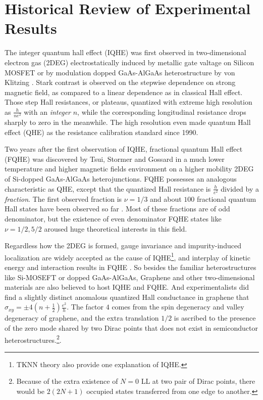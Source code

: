 \documentclass[bachelor,english,numbers]{ustcthesis}
\begin{document}
	\section{Historical Review of Experimental Results}
		\indent\par The integer quantum hall effect (IQHE) was first observed in two-dimensional electron gas (2DEG) electrostatically induced by metallic gate valtage on Silicon MOSFET or by modulation dopped GaAs-AlGaAs heterostructure by von Klitzing \cite{klitzing1980new,von1986quantized,comtet2000aspects}. Stark contrast is observed on the stepwise dependence on strong magnetic field, as compared to a linear dependence as in classical Hall effect. Those step Hall resistances, or plateaus, quantized with extreme high resolution as $\frac{h}{ne^2}$ with an \emph{integer} $n$, while the corresponding longitudinal resistance drops sharply to zero in the meanwhile. The high resolution even made quantum Hall effect (QHE) as the resistance calibration standard since 1990.\par

		Two years after the first observation of IQHE, fractional quantum Hall effect (FQHE) was discovered by Tsui, Stormer and Gossard \cite{tsui1982two,stormer1999fractional} in a much lower temperature and higher magnetic fields environment on a higher mobility 2DEG of Si-dopped GaAs-AlGaAs heterojunctions. FQHE possesses an analogous characteristic as QHE, except that the quantized Hall resistance is $\frac{h}{e^2}$ divided by a \emph{fraction}. The first observed fraction is $\nu=1/3$ and about $100$ fractional quantum Hall states have been observed so far \cite{laughlin1983anomalous}. Most of these fractions are of odd denominator, but the existence of even denominator FQHE states like $\nu=1/2,5/2$ aroused huge theoretical interests in this field.\par
		
		Regardless how the 2DEG is formed, gauge invariance and impurity-induced localization \cite{von1986quantized,tong2016lectures} are widely accepted as the cause of IQHE\footnote{TKNN theory \cite{tong2016lectures} also provide one explanation of IQHE.}, and interplay of kinetic energy and interaction results in FQHE \cite{simon1998chern}. So besides the familiar heterostructures like Si-MOSEFT or dopped GaAs-AlGaAs, Graphene and other two-dimensional materials are also believed to host IQHE and FQHE. And experimentalists did find a slightly distinct anomalous quantized Hall conductance in graphene \cite{zhang2005experimental} that $\sigma_{xy}=\pm4(n+\frac{1}{2})\frac{e^2}{h}$. The factor $4$ comes from the spin degeneracy and valley degeneracy of graphene, and the extra translation $1/2$ is ascribed to the presence of the zero mode shared by two Dirac points that does not exist in semiconductor heterostructures.\footnote{Because of the extra existence of $N=0$ LL at two pair of Dirac points, there would be $2(2N+1)$ occupied states transferred from one edge to another.}\cite{gusynin2005unconventional,herbut2007theory,sarma2011electronic}.\par
\end{document}
